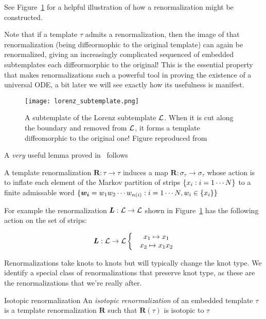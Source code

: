 \documentclass[paper.tex]{subfiles}
\begin{document}
See Figure~\ref{fig:lorenz_subtemplate} for a helpful illustration of how a renormalization might be constructed.

Note that if a template $\tau$ admits a renormalization, then the image of that renormalization (being diffeormophic to the original template) can again be renormalized, giving an increasingly complicated sequenced of embedded
subtemplates each diffeormorphic to the original! This is the essential property that makes renormalizations such a powerful tool in proving the existence of a universal ODE, a bit later
we will see exactly how its usefulness is manifest.

\begin{figure}[h]
  \centering
  \texttt{[image: lorenz\_subtemplate.png]}
  \caption{A subtemplate of the Lorenz subtemplate $\mathcal{L}$. When it is cut along the boundary and removed from $\mathcal{L}$, it forms a template diffeomorphic to the original one! Figure reproduced from~\cite{knottyode}}\label{fig:lorenz_subtemplate}
\end{figure}

A \emph{very} useful lemma proved in~\cite{knottyode} follows


\begin{lemma}
  A template renormalization $\bm{R}: \tau \to \tau$ induces a map $\bm{R}: \sigma_\tau \to \sigma_\tau$ whose action is to inflate each element of the Markov partition of strips $\{ x_i : i = 1\cdots N \}$ to a finite
  admissable word $\{ \bm{w_i} = w_1 w_2 \cdots w_{n(i)} : i = 1 \cdots N, w_i \in \{ x_i \} \}$
\end{lemma}

For example the renormalization $\bm{L} : \mathcal{L} \to \mathcal{L}$ shown in Figure~\ref{fig:lorenz_subtemplate} has the following action on the set of strips:

\begin{equation}
  \bm{L} : \mathcal{L} \to \mathcal{L} \left\{ \begin{matrix} & x_1 \mapsto x_1 \\ & x_2 \mapsto x_1 x_2 \end{matrix}\right.
\end{equation}

Renormalizations take knots to knots but will typically change the knot type. We identify a special class of renormalizations that preserve knot type, as these are the renormalizations that we're really after.


\begin{definition}{Isotopic renormalization}
  An \emph{isotopic renormalization} of an embedded template $\tau$ is a template renormalization $\bm{R}$ such that $\bm{R}(\tau)$ is isotopic to $\tau$
\end{definition}
\end{document}
